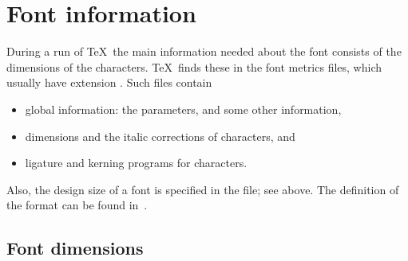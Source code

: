 \section{Font information}

During a run of \TeX\ the main information needed about the
%
font consists of the dimensions of the characters.
\TeX\ finds these in the font metrics files, which usually have
extension . Such files
contain \begin{itemize} \item global information: the 
parameters, and some other information,
\item dimensions and the italic corrections of characters, and
\altt 
\item ligature and kerning programs for characters.
	\end{itemize}
Also, the design size of a font is specified in the  file;
see above. The definition of the  format can be found
in~\cite{Knuth:TeXprogram}.

\subsection{Font dimensions}
\label{font:dims}

